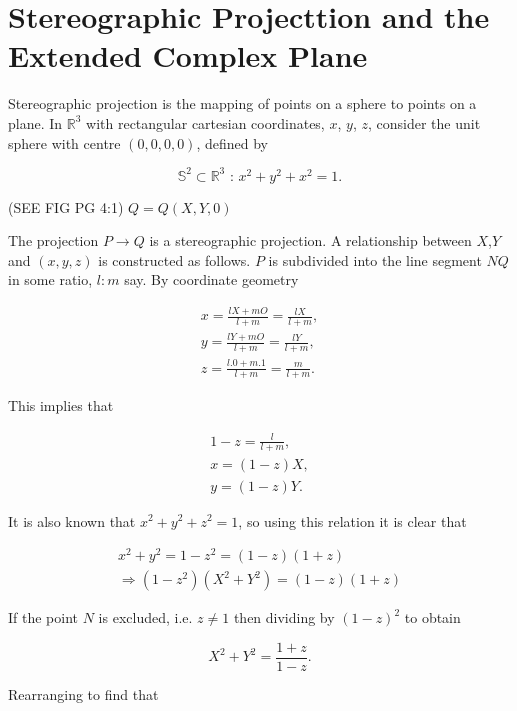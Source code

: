 \section{Stereographic Projecttion and the Extended Complex Plane}

Stereographic projection is the mapping of points on a sphere to points on a plane. In $\mathbb{R}^3$ with rectangular cartesian coordinates, $x$, $y$, $z$, consider the unit sphere with centre $(0,0,0,0)$, defined by

\begin{equation*}
\mathbb{S}^2 \subset \mathbb{R}^3 \text{ : } x^2 + y^2 + x^2 = 1.
\end{equation*}

(SEE FIG PG 4:1) $Q = Q(X,Y,0)$

\noindent The projection $P \rightarrow Q$ is a stereographic projection. A relationship between $X$,$Y$ and $(x,y,z)$ is constructed as follows. $P$ is subdivided into the line segment $NQ$ in some ratio, $l:m$ say. By coordinate geometry

\begin{eqnarray*}  
x = \frac{lX + mO}{l+m} = \frac{lX}{l+m}, \\
y = \frac{lY + mO}{l+m} = \frac{lY}{l+m}, \\
z = \frac{l.0+ m.1}{l+m} = \frac{m}{l+m}.
\end{eqnarray*}

\noindent This implies that

\begin{eqnarray*}
1-z = \frac{l}{l+m}, \\
x = (1-z)X, \\
y = (1-z)Y.
\end{eqnarray*}

\noindent It is also known that $x^2+ y^2 +z^2 = 1$, so using this relation it is clear that

\begin{eqnarray*}
x^2 + y^2 = 1-z^2 = (1-z) (1+z) \\
\Rightarrow (1-z^2)(X^2 +Y^2) = (1-z) (1+z)
\end{eqnarray*}

\noindent If the point $N$ is excluded, i.e. $z \neq 1$ then dividing by $(1-z)^2$ to obtain

\begin{equation*} 
X^2 + Y^2 = \frac{1+z}{1-z}.
\end{equation*}

\noindent Rearranging to find that


